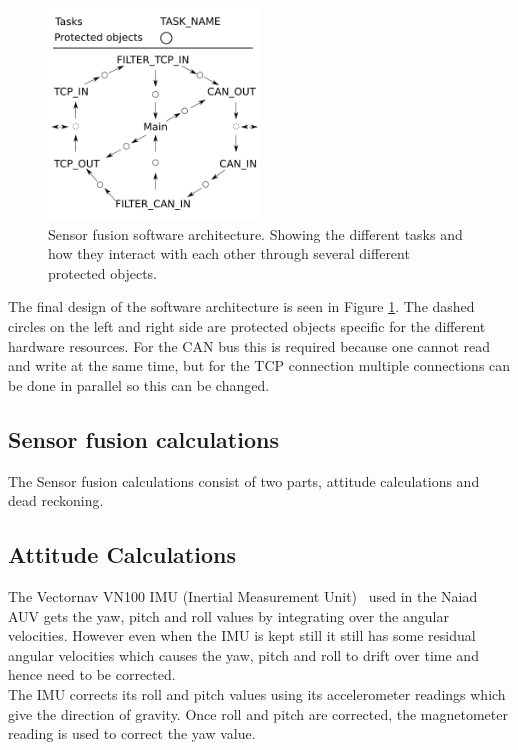 \begin{figure}[ht]
    \includegraphics[width=0.5\textwidth]{./figure/software_architecture.png}
    \caption{Sensor fusion software architecture. Showing the different tasks and
    how they interact with each other through several different protected objects.}
    \label{fig:software_architecture}
\end{figure}

The final design of the software architecture is seen in Figure \ref{fig:software_architecture}.
The dashed circles on the left and right side are protected objects specific for
the different hardware resources. For the CAN bus this is required because one
cannot read and write at the same time, but for the TCP connection multiple connections
can be done in parallel so this can be changed.


\subsection{Sensor fusion calculations}
The Sensor fusion calculations consist of two parts, attitude calculations and
dead reckoning.

\subsection{Attitude Calculations}
The Vectornav VN100 IMU (Inertial Measurement Unit)~\cite{web:vn100} used in 
the Naiad AUV gets the yaw, pitch and roll values by integrating over the
angular velocities. However even when the IMU is kept still it still has
some residual angular velocities which causes the yaw, pitch and roll to drift
over time and hence need to be corrected. \\
The IMU corrects its roll and pitch values using its accelerometer 
readings which give the direction of gravity.
Once roll and pitch are corrected, the magnetometer reading is used to correct
the yaw value.

